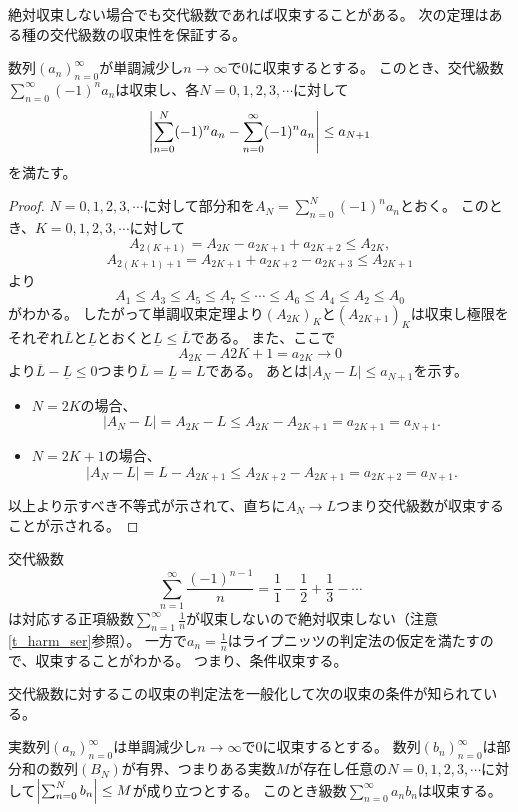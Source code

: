 絶対収束しない場合でも交代級数であれば収束することがある。
次の定理はある種の交代級数の収束性を保証する。

\begin{theorem}[ライプニッツの判定法]
数列$(a_n)_{n = 0}^\infty$が単調減少し$n \to \infty$で$0$に収束するとする。
このとき、交代級数$\sum_{n = 0}^\infty (-1)^n a_n$は収束し、各$N = 0, 1, 2, 3, \cdots$に対して
$$
\abs{\sum_{n = 0}^N (-1)^n a_n-\sum_{n = 0}^\infty (-1)^n a_n} \le a_{N+1}
$$
を満たす。
\end{theorem}

\begin{proof}
$N = 0, 1, 2, 3, \cdots$に対して部分和を$A_N = \sum_{n = 0}^N (-1)^n a_n$とおく。
このとき、$K = 0, 1, 2, 3, \cdots$に対して
$$
A_{2(K+1)} = A_{2 K}-a_{2 K+1}+a_{2 K+2} \le A_{2 K},
$$
$$
A_{2(K+1)+1} = A_{2 K+1}+a_{2 K+2}-a_{2 K+3} \le A_{2 K+1}
$$
より
$$
A_1 \le A_3 \le A_5 \le A_7 \le \cdots \le A_6 \le A_4 \le A_2 \le A_0
$$
がわかる。
したがって単調収束定理より$(A_{2 K})_K$と$(A_{2 K+1})_K$は収束し極限をそれぞれ$\overline{L}$と$\underline{L}$とおくと$\underline{L} \le \overline{L}$である。
また、ここで
$$
A_{2 K}-A{2 K+1} = a_{2 K} \to 0
$$
より$\overline{L}-\underline{L} \le 0$つまり$\overline{L} = \underline{L} = L$である。
あとは$|A_N-L| \le a_{N+1}$を示す。
\begin{itemize}
\item
$N = 2 K$の場合、
$$
|A_N-L| = A_{2 K}-L \le A_{2 K}-A_{2 K+1} = a_{2 K+1} = a_{N+1}.
$$
\item
$N = 2 K+1$の場合、
$$
|A_N-L| = L-A_{2 K+1} \le A_{2 K+2}-A_{2 K+1} = a_{2 K+2} = a_{N+1}.
$$
\end{itemize}
以上より示すべき不等式が示されて、直ちに$A_N \to L$つまり交代級数が収束することが示される。
\end{proof}

\begin{example}
\label{t_alt_harm_ser}
交代級数
$$
\sum_{n = 1}^\infty \frac{(-1)^{n-1}}{n} = \frac{1}{1}-\frac{1}{2}+\frac{1}{3}-\cdots
$$
は対応する正項級数$\sum_{n = 1}^\infty \frac{1}{n}$が収束しないので絶対収束しない（注意\ref{t_harm_ser}参照）。
一方で$a_n = \frac{1}{n}$はライプニッツの判定法の仮定を満たすので、収束することがわかる。
つまり、条件収束する。
\end{example}

交代級数に対するこの収束の判定法を一般化して次の収束の条件が知られている。

\begin{theorem}[ディリクレの判定法]
実数列$(a_n)_{n = 0}^\infty$は単調減少し$n \to \infty$で$0$に収束するとする。
数列$(b_n)_{n = 0}^\infty$は部分和の数列$(B_N)$が有界、つまりある実数$M$が存在し任意の$N = 0, 1, 2, 3, \cdots$に対して$\abs{\sum_{n = 0}^N b_n} \le M$が成り立つとする。
このとき級数$\sum_{n = 0}^\infty a_n b_n$は収束する。
\end{theorem}

